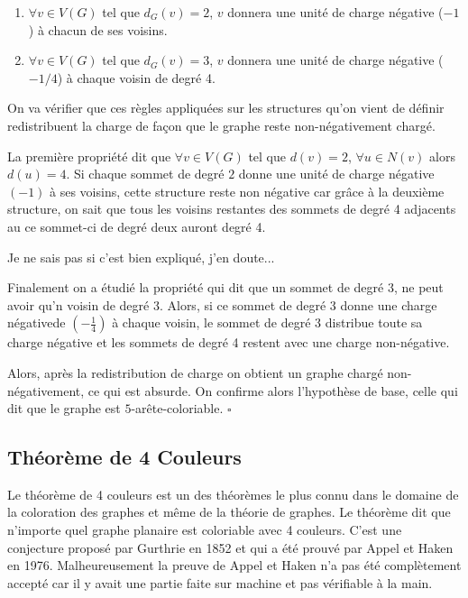 \documentclass[10pt,a4paper]{article}
\newcommand{\ep}{{\hfill $\square$}}
\begin{document}
\begin{enumerate}
\item $\forall v \in V(G)$ tel que $d_G(v) = 2$, $v$ donnera une unité de charge négative ($-1$) à chacun de ses voisins.
\item $\forall v \in V(G)$ tel que $d_G(v) = 3$, $v$ donnera une unité de charge négative ($-1/4$) à chaque voisin de degré 4.
\end{enumerate}

On va vérifier que ces règles appliquées sur les structures qu'on vient de définir redistribuent la charge de façon que le graphe reste non-négativement chargé.

La première propriété dit que $\forall v\in V(G)$ tel que $d(v) =2$, $\forall u \in N(v)$ alors $d(u) =4$. Si chaque sommet de degré $2$ donne une unité de charge négative $(-1)$ à ses voisins, cette structure reste non négative car grâce à la deuxième structure, on sait que tous les voisins restantes des sommets de degré 4 adjacents au ce sommet-ci de degré deux auront degré 4. 

{\color{red} Je ne sais pas si c'est bien expliqué, j'en doute...}

Finalement on a étudié la propriété qui dit que un sommet de degré 3, ne peut avoir qu'n voisin de degré 3. Alors, si ce sommet de degré 3 donne une charge négativede $(-\frac{1}{4})$ à chaque voisin, le sommet de degré 3 distribue toute sa charge négative et les sommets de degré 4 restent avec une charge non-négative.

Alors, après la redistribution de charge on obtient un graphe chargé non-négativement, ce qui est absurde. On confirme alors l'hypothèse de base, celle qui dit que le graphe est $5$-arête-coloriable.
\ep 


\subsection{Théorème de 4 Couleurs}







Le théorème de 4 couleurs est un des théorèmes le plus connu dans le domaine de la coloration des graphes et même de la théorie de graphes. Le théorème dit que n'importe quel graphe planaire est coloriable avec 4 couleurs. C'est une conjecture proposé par Gurthrie en 1852 et qui a été prouvé par Appel et Haken en 1976. Malheureusement la preuve de Appel et Haken n'a pas été complètement accepté car il y avait une partie faite sur machine et pas vérifiable à la main.
\end{document}
